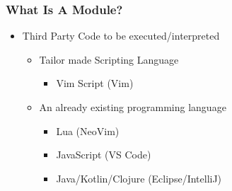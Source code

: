 \begin{frame}
  \frametitle{What Is A Module?}
  \begin{itemize}
    \item Third Party Code to be executed/interpreted
      \pause
      \begin{itemize}
        \item Tailor made Scripting Language
          \pause
          \begin{itemize}
            \item Vim Script (Vim)
              \pause
          \end{itemize}
        \item An already existing programming language
        \pause
          \begin{itemize}
            \item Lua (NeoVim)
            \pause
            \item JavaScript (VS Code)
            \pause
            \item Java/Kotlin/Clojure (Eclipse/IntelliJ)
          \end{itemize}
      \end{itemize}
  \end{itemize}
\end{frame}
